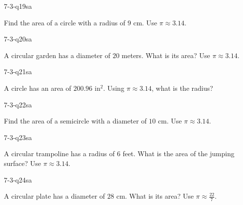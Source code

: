 \begin{practiceQuestion}{7-3-q19}{sa}
\begin{questionText}
Find the area of a circle with a radius of $9$ cm. Use $\pi \approx 3.14$.
\end{questionText}
\end{practiceQuestion}

\begin{practiceQuestion}{7-3-q20}{sa}
\begin{questionText}
A circular garden has a diameter of $20$ meters. What is its area? Use $\pi \approx 3.14$.
\end{questionText}
\end{practiceQuestion}

\begin{practiceQuestion}{7-3-q21}{sa}
\begin{questionText}
A circle has an area of $200.96$ in$^2$. Using $\pi \approx 3.14$, what is the radius?
\end{questionText}
\end{practiceQuestion}

\begin{practiceQuestion}{7-3-q22}{sa}
\begin{questionText}
Find the area of a semicircle with a diameter of $10$ cm. Use $\pi \approx 3.14$.
\end{questionText}
\end{practiceQuestion}

\begin{practiceQuestion}{7-3-q23}{sa}
\begin{questionText}
A circular trampoline has a radius of $6$ feet. What is the area of the jumping surface? Use $\pi \approx 3.14$.
\end{questionText}
\end{practiceQuestion}

\begin{practiceQuestion}{7-3-q24}{sa}
\begin{questionText}
A circular plate has a diameter of $28$ cm. What is its area? Use $\pi \approx \frac{22}{7}$.
\end{questionText}
\end{practiceQuestion}

